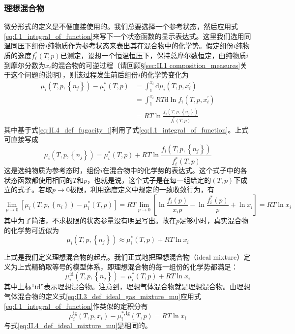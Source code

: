 \documentclass[main.tex]{subfiles}
\begin{document}
\subsubsection{理想混合物}
微分形式的定义是不便直接使用的。我们总要选择一个参考状态，然后应用式\eqref{eq:I.1_integral_of_function}来写下一个状态函数的显示表达式。这里我们选用同温同压下组份$i$纯物质作为参考状态来表出其在混合物中的化学势。假定组份$i$纯物质的逸度$f_i^*\left(T,p\right)$已测定，设想一个恒温恒压下，保持总摩尔数恒定，由纯物质$i$到摩尔分数为$x_i$的混合物的可逆过程（请回顾\S\ref{sec:II.1 composition_measures}关于这个问题的说明），则该过程发生前后组份$i$的化学势变化为
\begin{align*}
    \mu_i\left(T,p,\left\{n_j\right\}\right)-\mu_i^*\left(T,p\right) & =\int_1^{x_i}\mathrm{d}\mu_i\left(T,p,x_i^\prime\right)                    \\
                                                                     & =\int_1^{x_i}RT\mathrm{d}\ln f_i\left(T,p,x_i^\prime\right)                \\
                                                                     & =RT\ln\frac{f_i\left(T,p,\left\{n_j\right\}\right)}{f_i^*\left(T,p\right)}
\end{align*}
其中基于式\eqref{eq:II.4_def_fugacity_i}利用了式\eqref{eq:I.1_integral_of_function}。上式可直接写成
\[
    \mu_i\left(T,p,\left\{n_j\right\}\right)=\mu_i^*\left(T,p\right)+RT\ln\frac{f_i\left(T,p,\left\{n_j\right\}\right)}{f_i^*\left(T,p\right)}
\]
这是选纯物质为参考态时，组份$i$在混合物中的化学势的表达式。这个式子中的各状态函数都使用相同的$T$和$p$，也就是说，这个式子是在每一组给定的$\left(T,p\right)$下成立的式子。若取$p\rightarrow 0$极限，利用逸度定义中规定的一致收敛行为，有
\[\lim_{p\to 0}\left[\mu_i\left(T,p,\left\{n_i\right\}\right)-\mu_i^*\left(T,p\right)\right]=RT\lim_{p\to 0}\left[\ln\frac{f_i\left(p\right)}{x_ip}-\ln\frac{f_i^*\left(p\right)}{p}+\ln x_i\right]=RT\ln x_i\]
其中为了简洁，不求极限的状态参量没有明显写出。故在$p$足够小时，真实混合物的化学势可近似为
\[\mu_i\left(T,p,\left\{n_j\right\}\right)\approx\mu_i^*\left(T,p\right)+RT\ln x_i\]

上式是我们定义理想混合物的起点。我们正式地把理想混合物（ideal mixture）定义为上式精确取等号的模型体系，即理想混合物的每一组份的化学势都满足：
\begin{equation}\label{eq:II.4_def_ideal_mixture_mu}
    \mu_i^\text{id}\left(T,p,\left\{n_j\right\}\right)=\mu_i^*\left(T,p\right)+RT\ln x_i
\end{equation}
其中上标“id”表示理想混合物。注意到，理想气体混合物就是理想混合物。由理想气体混合物的定义式\eqref{eq:II.3_def_ideal_gas_mixture_mu}应用式\eqref{eq:I.1_integral_of_function}作类似的定积分有
\[\mu_i^\text{ig}\left(T,p,x_i\right)-\mu_i^{*,\text{ig}}\left(T,p\right)=RT\ln x_i\]
与式\eqref{eq:II.4_def_ideal_mixture_mu}是相同的。
\end{document}
